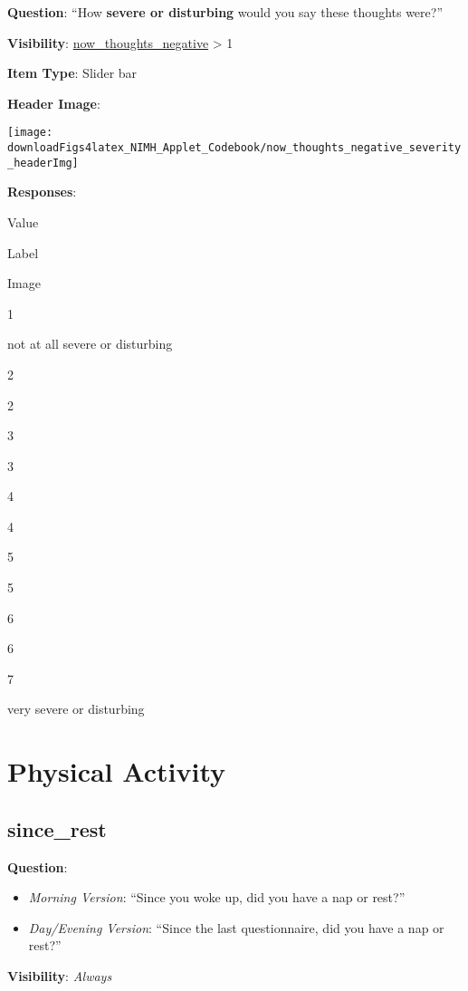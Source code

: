 \documentclass[]{book}
\providecommand{\tightlist}{%
  \setlength{\itemsep}{0pt}\setlength{\parskip}{0pt}}
\begin{document}
\textbf{Question}: ``How \textbf{severe or disturbing} would you say these thoughts were?''

\textbf{Visibility}: \protect\hyperlink{now_thoughts_negative}{now\_thoughts\_negative} \textgreater{} 1

\textbf{Item Type}: Slider bar

\textbf{Header Image}:

\begin{flushleft}\texttt{[image: downloadFigs4latex\_NIMH\_Applet\_Codebook/now\_thoughts\_negative\_severity\_headerImg]} \end{flushleft}

\textbf{Responses}:

Value

Label

Image

1

not at all severe or disturbing

2

2

3

3

4

4

5

5

6

6

7

very severe or disturbing

\hypertarget{activity_section}{%
\chapter{Physical Activity}\label{activity_section}}

\hypertarget{since_rest}{%
\section{since\_rest}\label{since_rest}}

\textbf{Question}:

\begin{itemize}
\tightlist
\item
  \emph{Morning Version}: ``Since you woke up, did you have a nap or rest?''
\item
  \emph{Day/Evening Version}: ``Since the last questionnaire, did you have a nap or rest?''
\end{itemize}

\textbf{Visibility}: \emph{Always}
\end{document}
